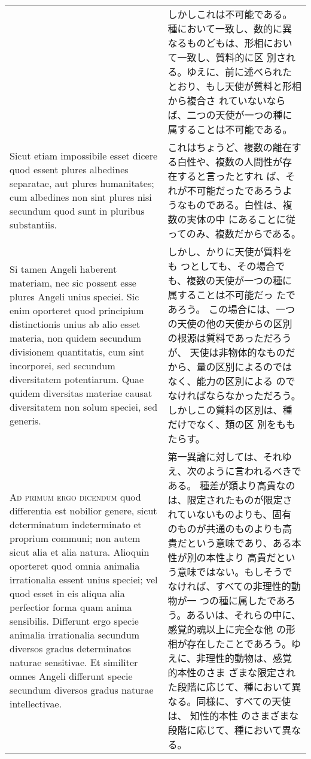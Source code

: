 \documentclass[10pt]{jsarticle} %
\begin{document}
\begin{longtable}{p{21em}p{21em}}
&

しかしこれは不可能である。
種において一致し、数的に異なるものどもは、形相において一致し、質料的に区
 別される。ゆえに、前に述べられたとおり、もし天使が質料と形相から複合さ
 れていないならば、二つの天使が一つの種に属することは不可能である。


\\


Sicut etiam impossibile
esset dicere quod essent plures albedines separatae, aut plures
humanitates; cum albedines non sint plures nisi secundum quod sunt in
pluribus substantiis. 






&

これはちょうど、複数の離在する白性や、複数の人間性が存在すると言ったとすれ
 ば、それが不可能だったであろうようなものである。白性は、複数の実体の中
 にあることに従ってのみ、複数だからである。


\\

Si tamen Angeli haberent materiam, nec sic possent
esse plures Angeli unius speciei. 
Sic enim oporteret quod principium
distinctionis unius ab alio esset materia, non quidem secundum
divisionem quantitatis, cum sint incorporei, sed secundum diversitatem
potentiarum. Quae quidem diversitas materiae causat diversitatem non
solum speciei, sed generis.


&

しかし、かりに天使が質料をも
 つとしても、その場合でも、複数の天使が一つの種に属することは不可能だっ
 たであろう。
この場合には、一つの天使の他の天使からの区別の根源は質料であっただろうが、
 天使は非物体的なものだから、量の区別によるのではなく、能力の区別による
 のでなければならなかっただろう。しかしこの質料の区別は、種だけでなく、類の区
 別をももたらす。


\\


{\scshape Ad primum ergo dicendum} quod differentia est
nobilior genere, sicut determinatum indeterminato et proprium communi;
non autem sicut alia et alia natura. Alioquin oporteret quod omnia
animalia irrationalia essent unius speciei; vel quod esset in eis aliqua
alia perfectior forma quam anima sensibilis. Differunt ergo specie
animalia irrationalia secundum diversos gradus determinatos naturae
sensitivae. Et similiter omnes Angeli differunt specie secundum diversos
gradus naturae intellectivae.


&

第一異論に対しては、それゆえ、次のように言われるべきである。
種差が類より高貴なのは、限定されたものが限定されていないものよりも、固有
 のものが共通のものよりも高貴だという意味であり、ある本性が別の本性より
 高貴だという意味ではない。もしそうでなければ、すべての非理性的動物が一
 つの種に属したであろう。あるいは、それらの中に、感覚的魂以上に完全な他
 の形相が存在したことであろう。ゆえに、非理性的動物は、感覚的本性のさま
 ざまな限定された段階に応じて、種において異なる。同様に、すべての天使は、
 知性的本性 のさまざまな段階に応じて、種において異なる。




\end{longtable}
\end{document}
